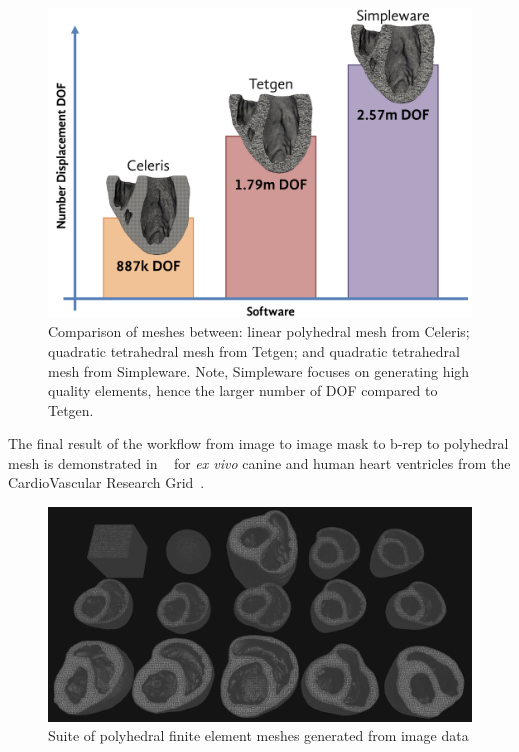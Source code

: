 \begin{figure}[ht!]
\centering
		\includegraphics[scale=0.2]{media/comparison.png}
%
\caption{Comparison of meshes between: linear polyhedral mesh from Celeris; quadratic tetrahedral mesh from Tetgen; and quadratic tetrahedral mesh from Simpleware. Note, Simpleware focuses on generating high quality elements, hence the larger number of DOF compared to Tetgen.}
\label{fig:compdof}
\end{figure}

The final result of the workflow from image to image mask to b-rep to polyhedral mesh is demonstrated in ~ for \textit{ex vivo} canine and human heart ventricles from the CardioVascular Research Grid~\cite{cvgg}.

\begin{figure}
\centering
\includegraphics[width=1.0\textwidth]{media/3-celeris/7-suite.png}
\caption{Suite of polyhedral finite element meshes generated from image data \vspace{1cm}}
\label{fig:celsuite}
\end{figure}

